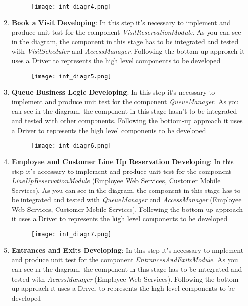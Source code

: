 \begin{enumerate}
\begin{figure}[H]
                \centering
                \texttt{[image: int\_diagr4.png]}
            \end{figure}
            \item \textbf{Book a Visit Developing}: In this step it's necessary to implement and produce unit test for the component \textit{VisitReservationModule}. As you can see in the diagram, the component in this stage has to be integrated and tested with \textit{VisitScheduler} and \textit{AccessManager}. Following the bottom-up approach it uses a Driver to represents the high level components to be developed \begin{figure}[H]
                \centering
                \texttt{[image: int\_diagr5.png]}
            \end{figure}
            \item \textbf{Queue Business Logic Developing}: In this step it's necessary to implement and produce unit test for the component \textit{QueueManager}. As you can see in the diagram, the component in this stage hasn't to be integrated and tested with other components. Following the bottom-up approach it uses a Driver to represents the high level components to be developed \begin{figure}[H]
                \centering
                \texttt{[image: int\_diagr6.png]}
            \end{figure}
            \item \textbf{Employee and Customer Line Up Reservation Developing}: In this step it's necessary to implement and produce unit test for the component \textit{LineUpReservationModule} (Employee Web Services, Customer Mobile Services). As you can see in the diagram, the component in this stage has to be integrated and tested with \textit{QueueManager} and \textit{AccessManager} (Employee Web Services, Customer Mobile Services). Following the bottom-up approach it uses a Driver to represents the high level components to be developed \begin{figure}[H]
                \centering
                \texttt{[image: int\_diagr7.png]}
            \end{figure}
            \item \textbf{Entrances and Exits Developing}: In this step it's necessary to implement and produce unit test for the component \textit{EntrancesAndExitsModule}. As you can see in the diagram, the component in this stage has to be integrated and tested with \textit{AccessManager} (Employee Web Services). Following the bottom-up approach it uses a Driver to represents the high level components to be developed \begin{figure}[H]

\end{figure}
\end{enumerate}
